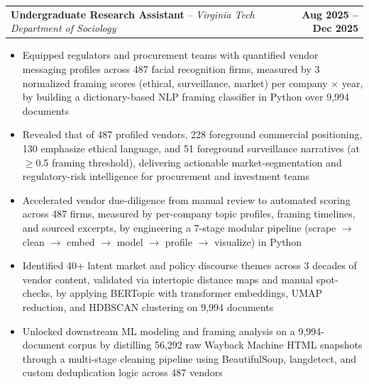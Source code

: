\documentclass[letterpaper,11pt]{article}
\makeatletter
\newcommand{\resumeItem}[1]{
  \item\small{{#1 \vspace{-2pt}}}
}
\newcommand{\resumeSubheading}[4]{%
  \vspace{-2pt}\item
    \begin{tabular*}{1.0\textwidth}[t]{l@{\extracolsep{\fill}}r}
      \textbf{#1}{ -- }\textit{\small #3}%
      \ifthenelse{\equal{#4}{}}{}{, \textit{\small #4}}%
      & \textbf{\small #2} \\
    \end{tabular*}\vspace{-7pt}
}
\newcommand{\resumeItemListStart}{\begin{itemize}}
\newcommand{\resumeItemListEnd}{\end{itemize}\vspace{-5pt}}
\makeatother
\begin{document}
        \resumeSubheading
            {Undergraduate Research Assistant}
            {Aug 2025 -- Dec 2025}
            {Virginia Tech Department of Sociology}
            {Blacksburg, VA}
            \resumeItemListStart
                \resumeItem{Equipped regulators and procurement teams with quantified vendor messaging profiles across 487 facial recognition firms, measured by 3 normalized framing scores (ethical, surveillance, market) per company $\times$ year, by building a dictionary-based NLP framing classifier in Python over 9,994 documents}
                \resumeItem{Revealed that of 487 profiled vendors, 228 foreground commercial positioning, 130 emphasize ethical language, and 51 foreground surveillance narratives (at $\geq$0.5 framing threshold), delivering actionable market-segmentation and regulatory-risk intelligence for procurement and investment teams}
                \resumeItem{Accelerated vendor due-diligence from manual review to automated scoring across 487 firms, measured by per-company topic profiles, framing timelines, and sourced excerpts, by engineering a 7-stage modular pipeline (scrape $\rightarrow$ clean $\rightarrow$ embed $\rightarrow$ model $\rightarrow$ profile $\rightarrow$ visualize) in Python}
                \resumeItem{Identified 40+ latent market and policy discourse themes across 3 decades of vendor content, validated via intertopic distance maps and manual spot-checks, by applying BERTopic with transformer embeddings, UMAP reduction, and HDBSCAN clustering on 9,994 documents}
                \resumeItem{Unlocked downstream ML modeling and framing analysis on a 9,994-document corpus by distilling 56,292 raw Wayback Machine HTML snapshots through a multi-stage cleaning pipeline using BeautifulSoup, langdetect, and custom deduplication logic across 487 vendors}
            \resumeItemListEnd
\end{document}
